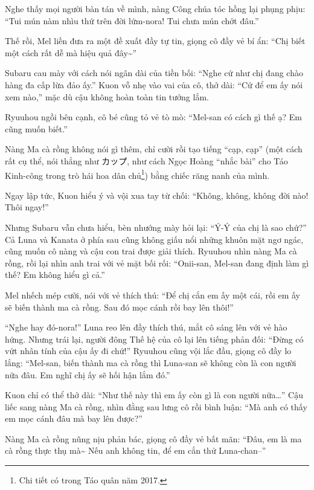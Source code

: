 \documentclass[../main.tex]{subfiles}
\begin{document}

Nghe thấy mọi người bàn tán về mình, nàng Công chúa tóc hồng lại phụng phịu: ``Tui mún nàm nhìu thứ trên đời lứm-nora! Tui chưa mún chớt đâu.''

Thế rồi, Mel liền đưa ra một đề xuất đầy tự tin, giọng cô đầy vẻ bí ẩn: ``Chị biết một cách rất dễ mà hiệu quả đây\~{}''

Subaru cau mày với cách nói ngân dài của tiền bối: ``Nghe cứ như chị đang chào hàng đa cấp lừa đảo ấy.'' Kuon vỗ nhẹ vào vai của cô, thở dài: ``Cứ để em ấy nói xem nào,'' mặc dù cậu không hoàn toàn tin tưởng lắm.

Ryuuhou ngồi bên cạnh, cô bé cũng tỏ vẻ tò mò: ``Mel-san có cách gì thế ạ? Em cũng muốn biết.''

Nàng Ma cà rồng không nói gì thêm, chỉ cười rồi tạo tiếng ``cạp, cạp'' (một cách rất cụ thể, nói thẳng như カップ, như cách Ngọc Hoàng ``nhắc bài'' cho Táo Kinh-công trong trò hái hoa dân chủ\footnote{Chi tiết có trong Táo quân năm 2017.}) bằng chiếc răng nanh của mình.


Ngay lập tức, Kuon hiểu ý và vội xua tay từ chối: ``Không, không, không đời nào! Thôi ngay!''

Nhưng Subaru vẫn chưa hiểu, bèn nhướng mày hỏi lại: ``Ý-Ý của chị là sao chứ?'' Cả Luna và Kanata ở phía sau cũng không giấu nổi những khuôn mặt ngơ ngác, cũng muốn cô nàng và cậu con trai được giải thích. Ryuuhou nhìn nàng Ma cà rồng, rồi lại nhìn anh trai với vẻ mặt bối rối: ``Onii-san, Mel-san đang định làm gì thế? Em không hiểu gì cả.''

Mel nhếch mép cười, nói với vẻ thích thú: ``Để chị cắn em ấy một cái, rồi em ấy sẽ biến thành ma cà rồng. Sau đó mọc cánh rồi bay lên thôi!''

``Nghe hay đó-nora!'' Luna reo lên đầy thích thú, mắt cô sáng lên với vẻ hào hứng. Nhưng trái lại, người đông Thế hệ của cô lại lên tiếng phản đối: ``Đừng có vứt nhân tính của cậu ấy đi chứ!'' Ryuuhou cũng vội lắc đầu, giọng cô đầy lo lắng: ``Mel-san, biến thành ma cà rồng thì Luna-san sẽ không còn là con người nữa đâu. Em nghĩ chị ấy sẽ hối hận lắm đó.''

Kuon chỉ có thể thở dài: ``Như thế này thì em ấy còn gì là con người nữa\dots'' Cậu liếc sang nàng Ma cà rồng, nhìn đằng sau lưng cô rồi bình luận: ``Mà anh có thấy em mọc cánh đâu mà bay lên được?''

Nàng Ma cà rồng nũng nịu phản bác, giọng cô đầy vẻ bất mãn: ``Đâu, em là ma cà rồng thực thụ mà\~{} Nếu anh không tin, để em cắn thử Luna-chan--''
\end{document}
